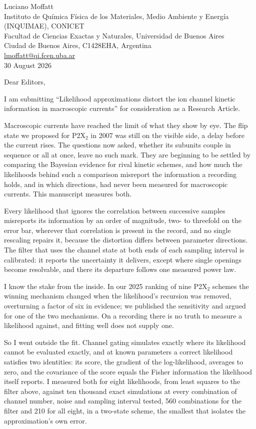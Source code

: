 \documentclass[10.5pt,a4paper]{article}
\begin{document}
\begin{flushright}
Luciano Moffatt\\
Instituto de Química Física de los Materiales, Medio Ambiente y Energía (INQUIMAE), CONICET\\
Facultad de Ciencias Exactas y Naturales, Universidad de Buenos Aires\\
Ciudad de Buenos Aires, C1428EHA, Argentina\\
\href{mailto:lmoffatt@qi.fcen.uba.ar}{lmoffatt@qi.fcen.uba.ar}\\[0.6em]
30 August 2026
\end{flushright}

Dear Editors,

I am submitting ``Likelihood approximations distort the ion channel kinetic information in
macroscopic currents'' for consideration as a Research Article.

Macroscopic currents have reached the limit of what they show by eye. The flip state we proposed
for P2X$_2$ in 2007 was still on the visible side, a delay before the current rises. The questions
now asked, whether its subunits couple in sequence or all at once, leave no such mark. They are
beginning to be settled by comparing the Bayesian evidence for rival kinetic schemes, and how
much the likelihoods behind such a comparison misreport the information a recording holds, and
in which directions, had never been measured for macroscopic currents. This manuscript measures
both.

Every likelihood that ignores the correlation between successive samples misreports its
information by an order of magnitude, two- to threefold on the error bar, wherever that
correlation is present in the record, and no single rescaling repairs it, because the distortion
differs between parameter directions. The filter that uses the channel state at both ends of each
sampling interval is calibrated: it reports the uncertainty it delivers, except where single
openings become resolvable, and there its departure follows one measured power law.

I know the stake from the inside. In our 2025 ranking of nine P2X$_2$ schemes the winning
mechanism changed when the likelihood's recursion was removed, overturning a factor of six in
evidence; we published the sensitivity and argued for one of the two mechanisms. On a recording
there is no truth to measure a likelihood against, and fitting well does not supply one.

So I went outside the fit. Channel gating simulates exactly where its likelihood cannot be
evaluated exactly, and at known parameters a correct likelihood satisfies two identities: its
score, the gradient of the log-likelihood, averages to zero, and the covariance of the score
equals the Fisher information the likelihood itself reports. I measured both for eight
likelihoods, from least squares to the filter above, against ten thousand exact simulations at
every combination of channel number, noise and sampling interval tested, 560 combinations for
the filter and 210 for all eight, in a two-state scheme, the smallest that isolates the
approximation's own error.
\end{document}
